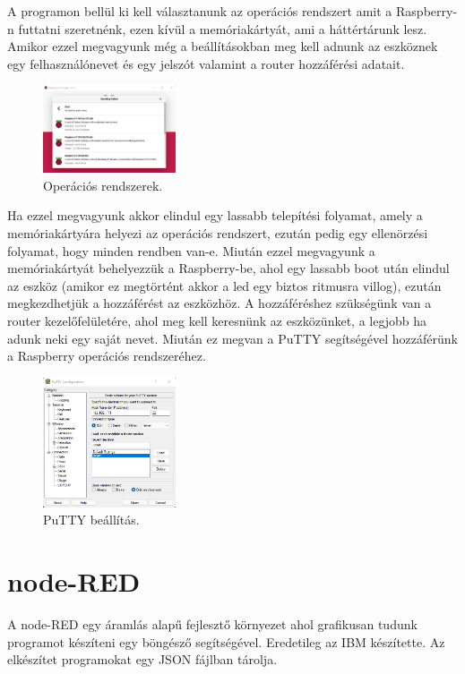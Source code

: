 \documentclass[a4paper,12pt,oneside]{report}
\begin{document}
A programon bellül ki kell választanunk az operációs rendszert amit a Raspberry-n futtatni szeretnénk, ezen kívül a memóriakártyát, 
ami a háttértárunk lesz. Amikor ezzel megvagyunk még a beállításokban meg kell adnunk az eszköznek egy felhasználónevet és egy jelszót
valamint a router hozzáférési adatait.

\begin{figure}[htbp]
	\centering
	\includegraphics[width=0.35\textwidth]{fig/os.png}
	\caption{Operációs rendszerek.}
	\label{fig-os}
\end{figure}

Ha ezzel megvagyunk akkor elindul egy lassabb telepítési folyamat, amely a memóriakártyára helyezi az operációs rendszert, ezután pedig
egy ellenörzési folyamat, hogy minden rendben van-e.
Miután ezzel megvagyunk a memóriakártyát behelyezzük a Raspberry-be, ahol egy lassabb boot után elindul az eszköz (amikor ez megtörtént
akkor a led egy biztos ritmusra villog), ezután megkezdhetjük a hozzáférést az eszközhöz. 
A hozzáféréshez szükségünk van a router kezelőfelületére, ahol meg kell keresnünk az eszközünket, a legjobb ha adunk neki
egy saját nevet. Miután ez megvan a PuTTY segítségével hozzáférünk a Raspberry operációs rendszeréhez.

\begin{figure}[htbp]
	\centering
	\includegraphics[width=0.35\textwidth]{fig/putty.png}
	\caption{PuTTY beállítás.}
	\label{fig-putty}
\end{figure}

\chapter{node-RED}

A node-RED egy áramlás alapű fejlesztő környezet ahol grafikusan tudunk programot készíteni egy böngésző segítségével. Eredetileg az IBM
készítette. Az elkészítet programokat egy JSON fájlban tárolja.
\end{document}
